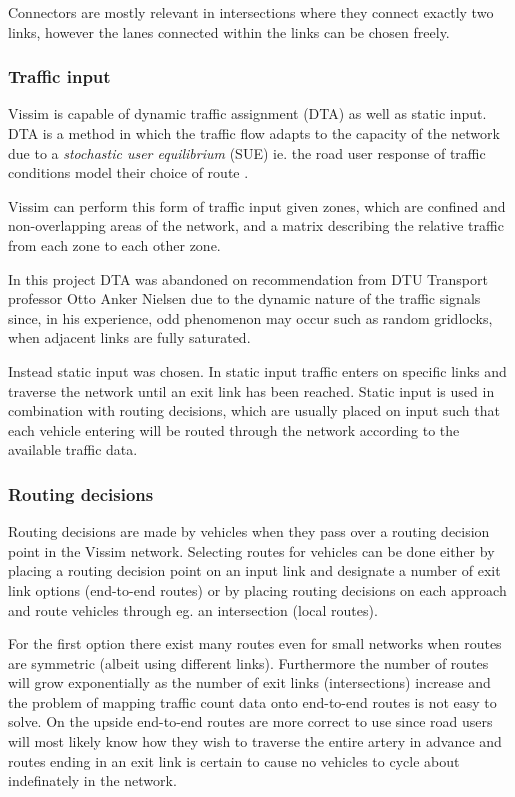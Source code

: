 Connectors are mostly relevant in intersections where they connect exactly two links, however the lanes connected within the links can be chosen freely.

\subsubsection*{Traffic input}
Vissim is capable of dynamic traffic assignment (DTA) as well as static input. DTA is a method in which the traffic flow adapts to the capacity of the network due to a \textit{stochastic user equilibrium} (SUE) ie. the road user response of traffic conditions model their choice of route \cite{Wardrop}. 

Vissim can perform this form of traffic input given zones, which are confined and non-overlapping areas of the network, and a matrix describing the relative traffic from each zone to each other zone.

In this project DTA was abandoned on recommendation from DTU Transport professor Otto Anker Nielsen due to the dynamic nature of the traffic signals since, in his experience, odd phenomenon may occur such as random gridlocks, when adjacent links are fully saturated.

Instead static input was chosen. In static input traffic enters on specific links and traverse the network until an exit link has been reached. Static input is used in combination with routing decisions, which are usually placed on input such that each vehicle entering will be routed through the network according to the available traffic data.

\subsubsection*{Routing decisions}
\label{routingdecisions}
Routing decisions are made by vehicles when they pass over a routing decision point in the Vissim network. Selecting routes for vehicles can be done either by placing a routing decision point on an input link and designate a number of exit link options (end-to-end routes) or by placing routing decisions on each approach and route vehicles through eg. an intersection (local routes).

For the first option there exist many routes even for small networks when routes are symmetric (albeit using different links). Furthermore the number of routes will grow exponentially as the number of exit links (intersections) increase and the problem of mapping traffic count data onto end-to-end routes is not easy to solve. On the upside end-to-end routes are more correct to use since road users will most likely know how they wish to traverse the entire artery in advance and routes ending in an exit link is certain to cause no vehicles to cycle about indefinately in the network.

